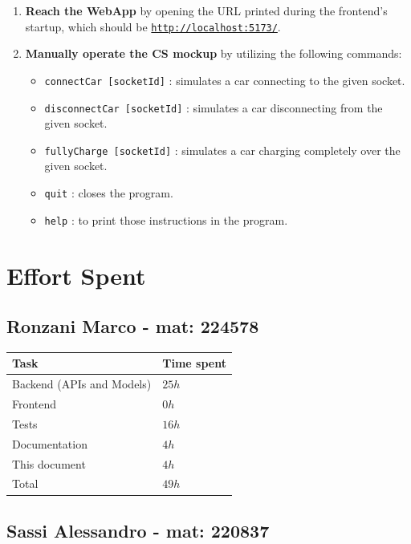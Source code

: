 \documentclass[11pt]{article}
\newcommand{\code}[1]{\colorbox{light-gray}{\texttt{#1}}}
\def\code#1{{\texttt{#1}}}
\begin{document}
\begin{enumerate}
    \item \textbf{Reach the WebApp} by opening the URL printed during the frontend's startup, which should be \code{\href{http://localhost:5173/}{http://localhost:5173/}}.
    \item \textbf{Manually operate the CS mockup} by utilizing the following commands:
    \begin{itemize}
        \item \code{connectCar [socketId]} : simulates a car connecting to the given socket.
        \item \code{disconnectCar [socketId]} : simulates a car disconnecting from the given socket.
        \item \code{fullyCharge [socketId]} : simulates a car charging completely over the given socket.
        \item \code{quit} : closes the program.
        \item \code{help} : to print those instructions in the program.
    \end{itemize}
\end{enumerate}

\section{Effort Spent}

\subsection{Ronzani Marco - mat: 224578}

\begin{tabular}{|l|l|}
    \hline
    \textbf{Task} & \textbf{Time spent} \\
    \hline
    Backend (APIs and Models) & $25 h$ \\
    \hline
    Frontend & $0 h$ \\
    \hline
    Tests & $16 h$ \\
    \hline
    Documentation & $4 h$ \\
    \hline
    This document & $4 h$ \\
    \hline
    \hline
    Total & $49 h$ \\
    \hline
\end{tabular}

\subsection{Sassi Alessandro - mat: 220837}
\end{document}
